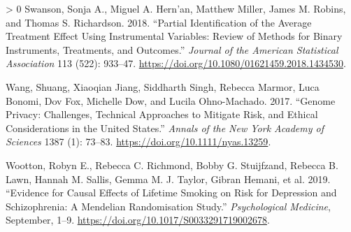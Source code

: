 \documentclass[
]{article}
\theoremstyle{plain}
\newlength{\cslhangindent}
\newenvironment{CSLReferences}[3] %
 {%
  \setlength{\parindent}{0pt}
  \ifodd #1 \everypar{\setlength{\hangindent}{\cslhangindent}}\ignorespaces\fi
  \ifnum #2 > 0
  \setlength{\parskip}{#2\baselineskip}
  \fi
 }%
 {}
\begin{document}
\begin{CSLReferences}{1}{0}
\leavevmode\hypertarget{ref-swanson_partial_2018}{}%
Swanson, Sonja A., Miguel A. Hern'an, Matthew Miller, James M. Robins, and Thomas S. Richardson. 2018. {``Partial {Identification} of the {Average Treatment Effect Using Instrumental Variables}: {Review} of {Methods} for {Binary Instruments}, {Treatments}, and {Outcomes}.''} \emph{Journal of the American Statistical Association} 113 (522): 933--47. \url{https://doi.org/10.1080/01621459.2018.1434530}.

\leavevmode\hypertarget{ref-wang_genome_2017}{}%
Wang, Shuang, Xiaoqian Jiang, Siddharth Singh, Rebecca Marmor, Luca Bonomi, Dov Fox, Michelle Dow, and Lucila Ohno-Machado. 2017. {``Genome Privacy: Challenges, Technical Approaches to Mitigate Risk, and Ethical Considerations in the {United States}.''} \emph{Annals of the New York Academy of Sciences} 1387 (1): 73--83. \url{https://doi.org/10.1111/nyas.13259}.

\leavevmode\hypertarget{ref-wootton_evidence_2019}{}%
Wootton, Robyn E., Rebecca C. Richmond, Bobby G. Stuijfzand, Rebecca B. Lawn, Hannah M. Sallis, Gemma M. J. Taylor, Gibran Hemani, et al. 2019. {``Evidence for Causal Effects of Lifetime Smoking on Risk for Depression and Schizophrenia: A {Mendelian} Randomisation Study.''} \emph{Psychological Medicine}, September, 1--9. \url{https://doi.org/10.1017/S0033291719002678}.

\end{CSLReferences}
\end{document}

